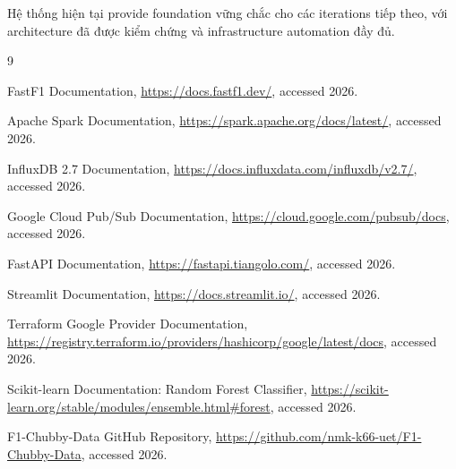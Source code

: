 \documentclass[conference,10pt]{IEEEtran}
\begin{document}
Hệ thống hiện tại provide foundation vững chắc cho các iterations tiếp theo, với architecture đã được kiểm chứng và infrastructure automation đầy đủ.

\begin{thebibliography}{9}

FastF1 Documentation, \url{https://docs.fastf1.dev/}, accessed 2026.

Apache Spark Documentation, \url{https://spark.apache.org/docs/latest/}, accessed 2026.

InfluxDB 2.7 Documentation, \url{https://docs.influxdata.com/influxdb/v2.7/}, accessed 2026.

Google Cloud Pub/Sub Documentation, \url{https://cloud.google.com/pubsub/docs}, accessed 2026.

FastAPI Documentation, \url{https://fastapi.tiangolo.com/}, accessed 2026.

Streamlit Documentation, \url{https://docs.streamlit.io/}, accessed 2026.

Terraform Google Provider Documentation, \url{https://registry.terraform.io/providers/hashicorp/google/latest/docs}, accessed 2026.

Scikit-learn Documentation: Random Forest Classifier, \url{https://scikit-learn.org/stable/modules/ensemble.html#forest}, accessed 2026.

F1-Chubby-Data GitHub Repository, \url{https://github.com/nmk-k66-uet/F1-Chubby-Data}, accessed 2026.

\end{thebibliography}
\end{document}
